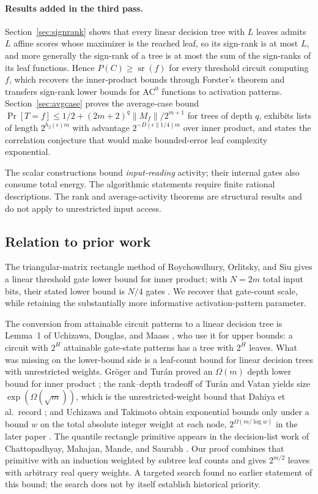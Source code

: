 \documentclass[11pt]{article}
\theoremstyle{definition}
\begin{document}
\paragraph{Results added in the third pass.}
Section~\ref{sec:signrank} shows that every linear decision tree with \(L\) leaves admits \(L\) affine scores whose maximizer is the reached leaf, so its sign-rank is at most \(L\), and more generally the sign-rank of a tree is at most the sum of the sign-ranks of its leaf functions. Hence \(P(C)\ge\operatorname{sr}(f)\) for every threshold circuit computing \(f\), which recovers the inner-product bounds through Forster's theorem and transfers sign-rank lower bounds for \(\mathrm{AC}^0\) functions to activation patterns. Section~\ref{sec:avgcase} proves the average-case bound \(\Pr[T=f]\le1/2+(2m+2)^q\|M_f\|/2^{m+1}\) for trees of depth \(q\), exhibits lists of length \(2^{h_2(\epsilon)m}\) with advantage \(2^{-D(\epsilon\|1/4)m}\) over inner product, and states the correlation conjecture that would make bounded-error leaf complexity exponential.

The scalar constructions bound \emph{input-reading} activity; their internal gates also consume total energy. The algorithmic statements require finite rational descriptions. The rank and average-activity theorems are structural results and do not apply to unrestricted input access.

\subsection{Relation to prior work}\label{sec:prior}
The triangular-matrix rectangle method of Roychowdhury, Orlitsky, and Siu gives a linear threshold gate lower bound for inner product; with \(N=2m\) total input bits, their stated lower bound is \(N/4\) gates \cite{ROS94}. We recover that gate-count scale, while retaining the substantially more informative activation-pattern parameter.

The conversion from attainable circuit patterns to a linear decision tree is Lemma~1 of Uchizawa, Douglas, and Maass \cite{UDM06}, who use it for upper bounds: a circuit with \(2^H\) attainable gate-state patterns has a tree with \(2^H\) leaves. What was missing on the lower-bound side is a leaf-count bound for linear decision trees with unrestricted weights. Gr\"oger and Tur\'an proved an \(\Omega(m)\) depth lower bound for inner product \cite{GT91}; the rank--depth tradeoff of Tur\'an and Vatan \cite{TV97} yields size \(\exp(\Omega(\sqrt m))\), which is the unrestricted-weight bound that Dahiya et al.\ record \cite{Dahiya23}; and Uchizawa and Takimoto obtain exponential bounds only under a bound \(w\) on the total absolute integer weight at each node, \(2^{\Omega(m/\log w)}\) in the later paper \cite{UT11,UT15}. The quantile rectangle primitive appears in the decision-list work of Chattopadhyay, Mahajan, Mande, and Saurabh \cite[Lemma 16]{CMMS20}. Our proof combines that primitive with an induction weighted by subtree leaf counts and gives \(2^{m/2}\) leaves with arbitrary real query weights. A targeted search found no earlier statement of this bound; the search does not by itself establish historical priority.
\end{document}
